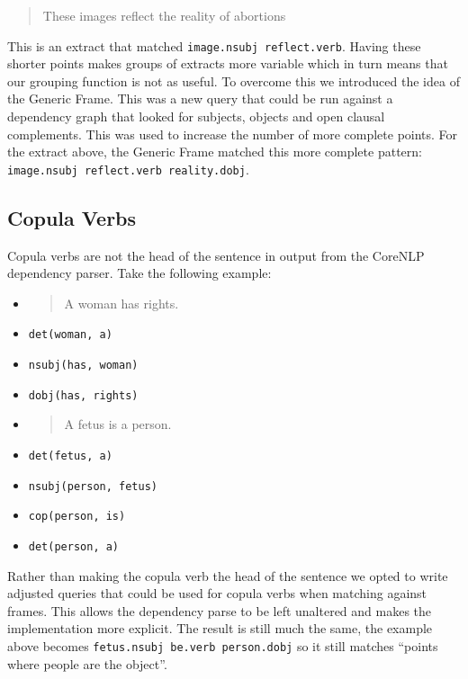       \blockquote{These images reflect the reality of abortions}

      This is an extract that matched \texttt{image.nsubj reflect.verb}. Having these shorter points makes groups of extracts more variable which in turn means that our grouping function is not as useful. To overcome this we introduced the idea of the Generic Frame. This was a new query that could be run against a dependency graph that looked for subjects, objects and open clausal complements. This was used to increase the number of more complete points. For the extract above, the Generic Frame matched this more complete pattern: \texttt{image.nsubj reflect.verb reality.dobj}.

    \tocless\subsection{Copula Verbs}
      Copula verbs are not the head of the sentence in output from the CoreNLP dependency parser. Take the following example:
      \begin{multicols}{2}
        \raggedcolumns
        \begin{itemize}[label={}]
          \item{\blockquote{A woman has rights.}}
          \item{\texttt{det(woman, a)}}
          \item{\texttt{nsubj(has, woman)}}
          \item{\texttt{dobj(has, rights)}}
        \end{itemize}
        \columnbreak
        \begin{itemize}[label={}]
          \item{\blockquote{A fetus is a person.}}
          \item{\texttt{det(fetus, a)}}
          \item{\texttt{nsubj(person, fetus)}}
          \item{\texttt{cop(person, is)}}
          \item{\texttt{det(person, a)}}
        \end{itemize}
      \end{multicols}

      Rather than making the copula verb the head of the sentence we opted to write adjusted queries that could be used for copula verbs when matching against frames. This allows the dependency parse to be left unaltered and makes the implementation more explicit. The result is still much the same, the example above becomes \texttt{fetus.nsubj be.verb person.dobj} so it still matches ``points where people are the object''.

